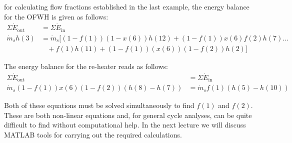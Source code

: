  for calculating flow fractions established in the last example, the energy balance for the OFWH is given as follows:
\begin{align*}
\Sigma \dot{E}_{\text{out}} &= \Sigma \dot{E}_{\text{in}} \\
\dot{m}_s h(3) &= \dot{m}_s [(1-f(1))(1-x(6))h(12) + (1-f(1))x(6)f(2)h(7)\dots \\
               & \ \ \ \ + f(1)h(11) + (1-f(1))(x(6))(1-f(2))h(2) ]
\end{align*}

The energy balance for the re-heater reads as follows:
\begin{align*}
\Sigma \dot{E}_{\text{out}} &= \Sigma \dot{E}_{\text{in}} \\
\dot{m}_s(1-f(1))x(6)(1-f(2))(h(8)-h(7))&=\dot{m}_s f(1)(h(5)-h(10))
\end{align*}

Both of these equations must be solved simultaneously to find $f(1)$ and $f(2)$.  These are both non-linear equations and, for general cycle analyses, can be quite difficult to find without computational help.  In the next lecture we will discuss MATLAB tools for carrying out the required calculations.



